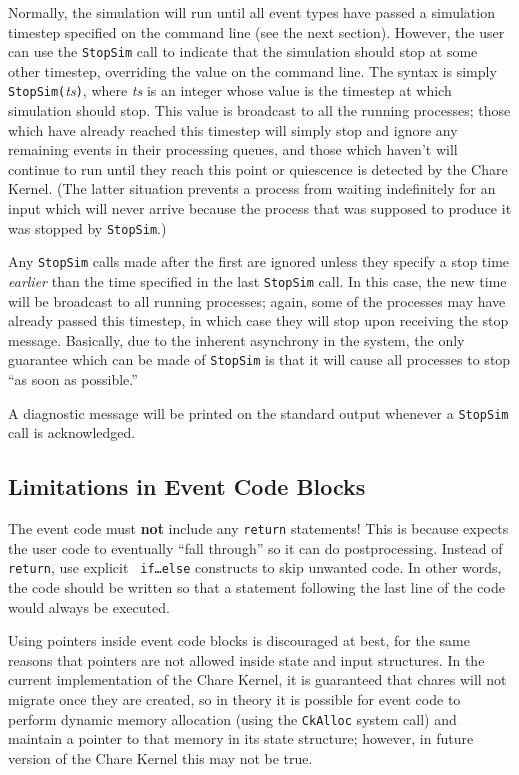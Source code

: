 Normally, the simulation will run until all event types have passed a
simulation timestep specified on the command line (see the next
section).  However, the user can use the {\tt StopSim} call to indicate
that the simulation should stop at some other timestep, overriding the
value on the command line.  The syntax is
simply {\tt StopSim(}{\em ts}{\tt )}, where {\em ts} is an integer whose
value is the timestep at which simulation should stop.  This value is
broadcast to all the running processes; those which have already reached
this timestep will simply stop and ignore any remaining events in their
processing queues, and those which haven't will continue to run until
they reach this point or quiescence is detected by the Chare Kernel.
(The latter situation prevents a process from waiting indefinitely for
an input which will never arrive because the process that was supposed
to produce it was stopped by {\tt StopSim}.)

Any {\tt StopSim} calls  made after the first are ignored unless they
specify a stop time {\em earlier} than the time specified in the last
{\tt StopSim} call.  In this case, the new time will be broadcast to all
running processes; again, some of the processes may have already passed
this timestep, in which case they will stop upon receiving the stop
message.  Basically, due to the inherent asynchrony in the system, the
only guarantee which can be made of {\tt StopSim} is that it will cause
all processes to stop ``as soon as possible.''

A diagnostic message will be printed on the standard output whenever a
{\tt StopSim} call is acknowledged.

\subsection{Limitations in Event Code Blocks}

The event code must {\bf not} include any {\tt return} statements!  This
is because \dispare expects the user code to eventually ``fall through''
so it can do postprocessing.  Instead of {\tt return}, use explicit {\tt
if\ldots else} constructs to skip unwanted code.  In other words, the
code should be written so that a statement following the last line of
the code would always be executed.

Using pointers inside event code blocks is discouraged at best, for the
same reasons that pointers are not allowed inside state and input
structures.  In the current implementation of the Chare Kernel, it is
guaranteed that chares will not migrate once they are created, so in
theory it is possible for event code to perform dynamic memory
allocation (using the {\tt CkAlloc} system call) and maintain a pointer
to that memory in its state structure; however, in future version of the
Chare Kernel this may not be true.

